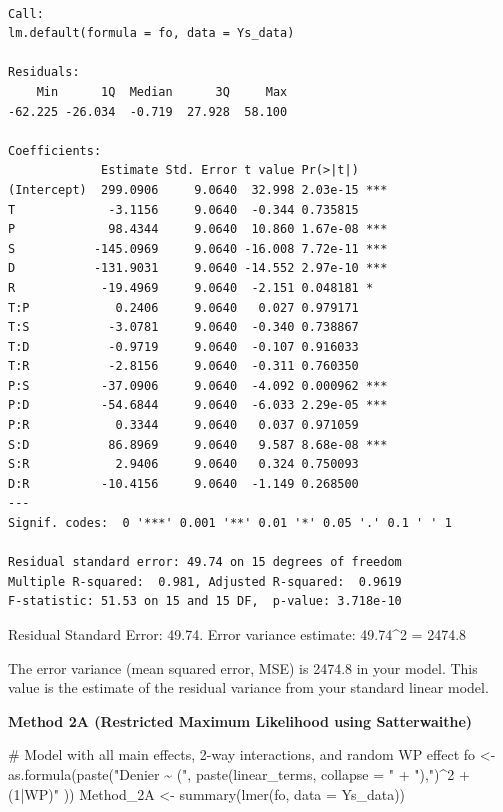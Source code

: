 \documentclass[
  letterpaper,
  DIV=11,
  numbers=noendperiod]{scrartcl}
\newenvironment{Shaded}{\begin{snugshade}}{\end{snugshade}}
\newcommand{\AttributeTok}[1]{\textcolor[rgb]{0.40,0.45,0.13}{#1}}
\newcommand{\CommentTok}[1]{\textcolor[rgb]{0.37,0.37,0.37}{#1}}
\newcommand{\FunctionTok}[1]{\textcolor[rgb]{0.28,0.35,0.67}{#1}}
\newcommand{\NormalTok}[1]{\textcolor[rgb]{0.00,0.23,0.31}{#1}}
\newcommand{\OtherTok}[1]{\textcolor[rgb]{0.00,0.23,0.31}{#1}}
\newcommand{\StringTok}[1]{\textcolor[rgb]{0.13,0.47,0.30}{#1}}
\begin{document}
\begin{verbatim}

Call:
lm.default(formula = fo, data = Ys_data)

Residuals:
    Min      1Q  Median      3Q     Max 
-62.225 -26.034  -0.719  27.928  58.100 

Coefficients:
             Estimate Std. Error t value Pr(>|t|)    
(Intercept)  299.0906     9.0640  32.998 2.03e-15 ***
T             -3.1156     9.0640  -0.344 0.735815    
P             98.4344     9.0640  10.860 1.67e-08 ***
S           -145.0969     9.0640 -16.008 7.72e-11 ***
D           -131.9031     9.0640 -14.552 2.97e-10 ***
R            -19.4969     9.0640  -2.151 0.048181 *  
T:P            0.2406     9.0640   0.027 0.979171    
T:S           -3.0781     9.0640  -0.340 0.738867    
T:D           -0.9719     9.0640  -0.107 0.916033    
T:R           -2.8156     9.0640  -0.311 0.760350    
P:S          -37.0906     9.0640  -4.092 0.000962 ***
P:D          -54.6844     9.0640  -6.033 2.29e-05 ***
P:R            0.3344     9.0640   0.037 0.971059    
S:D           86.8969     9.0640   9.587 8.68e-08 ***
S:R            2.9406     9.0640   0.324 0.750093    
D:R          -10.4156     9.0640  -1.149 0.268500    
---
Signif. codes:  0 '***' 0.001 '**' 0.01 '*' 0.05 '.' 0.1 ' ' 1

Residual standard error: 49.74 on 15 degrees of freedom
Multiple R-squared:  0.981, Adjusted R-squared:  0.9619 
F-statistic: 51.53 on 15 and 15 DF,  p-value: 3.718e-10
\end{verbatim}

Residual Standard Error: 49.74. Error variance estimate: 49.74\^{}2 =
2474.8

The error variance (mean squared error, MSE) is 2474.8 in your model.
This value is the estimate of the residual variance from your standard
linear model.

\textbf{Method 2A (Restricted Maximum Likelihood using Satterwaithe)}

\begin{Shaded}
\begin{Highlighting}[]
\CommentTok{\# Model with all main effects, 2{-}way interactions, and random WP effect}
\NormalTok{fo }\OtherTok{\textless{}{-}} \FunctionTok{as.formula}\NormalTok{(}\FunctionTok{paste}\NormalTok{(}\StringTok{"Denier \textasciitilde{} ("}\NormalTok{, }
    \FunctionTok{paste}\NormalTok{(linear\_terms, }\AttributeTok{collapse =} \StringTok{" + "}\NormalTok{),}\StringTok{")\^{}2 + (1|WP)"}
\NormalTok{  ))}
\NormalTok{Method\_2A }\OtherTok{\textless{}{-}} \FunctionTok{summary}\NormalTok{(}\FunctionTok{lmer}\NormalTok{(fo, }\AttributeTok{data =}\NormalTok{ Ys\_data))}
\end{Highlighting}
\end{Shaded}
\end{document}
